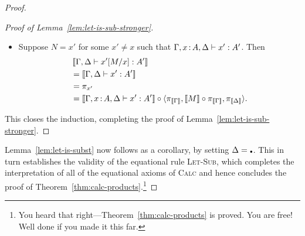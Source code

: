 \begin{proof}
\begin{proof}[Proof of Lemma~\ref{lem:let-is-sub-stronger}]
\begin{itemize}
\begin{align*}
        &= \llbr{\Gamma,\Delta \vdash M : A} \\
        &\stackrel{(*)}= \llbr{\Gamma \vdash M : A} \circ \pi_{\llbr{\Gamma}} \\
        &= \pi_x \circ \angled{\pi_{\llbr{\Gamma}}, \llbr{M} \circ \pi_{\llbr{\Gamma}}, \pi_{\llbr{\Delta}}}
      \end{align*}
      The step marked \((*)\) can be proved as a separate lemma, by induction on typing derivations.
    \item Suppose \(N = x'\) for some \(x' \ne x\) such that \(\Gamma,x\,{:}\, A,\Delta \vdash x' : A'\).
      Then
      \begin{align*}
        &\left\llbracket \Gamma,\Delta \vdash x'[M/x] : A'\right\rrbracket \\
        &= \left\llbracket \Gamma, \Delta  \vdash x' : A'\right\rrbracket\\
        &= \pi_{x'} \\
        &= \left\llbracket \Gamma,x\,{:}\, A,\Delta \vdash x' : A'\right\rrbracket
        \circ \langle \pi_{\left\llbracket \Gamma\right\rrbracket}, \left\llbracket M\right\rrbracket \circ \pi_{\left\llbracket \Gamma\right\rrbracket}, \pi_{\left\llbracket \Delta\right\rrbracket}\rangle.
      \end{align*}
    \end{itemize}
    This closes the induction, completing the proof of Lemma~\ref{lem:let-is-sub-stronger}.
  \end{proof}

  Lemma~\ref{lem:let-is-subst} now follows as a corollary, by setting \(\Delta = \ctxemp\).
  This in turn establishes the validity of the equational rule \textsc{Let-Sub},
  which completes the interpretation of all of the equational axioms of \textsc{Calc}
  and hence concludes the proof of Theorem~\ref{thm:calc-products}.\footnote{%
    You heard that right---Theorem~\ref{thm:calc-products} is proved.
    You are free! Well done if you made it this far.}
\end{proof}
